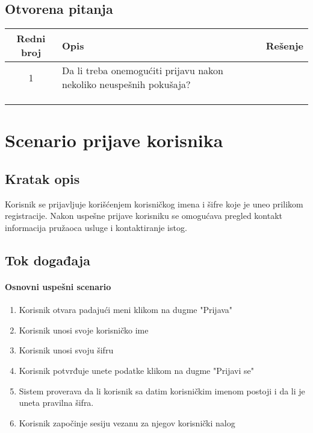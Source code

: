 \documentclass[a4paper,12pt]{report}
\newcommand{\genitivfunkcionalnosti}{prijave korisnika}
\begin{document}
		\subsection{Otvorena pitanja}
			\begin{tabular}{ |c|p{10cm}|l| }
				\hline
				\textbf{Redni broj} & \textbf{Opis} & \textbf{Rešenje} \\ 
				\hline
			    1 & Da li treba onemogućiti prijavu nakon nekoliko neuspešnih pokušaja? &  \\
				\hline
			    &  & \\
				\hline
				&  & \\
				\hline
				&  & \\
				\hline
			\end{tabular}
	\section{Scenario \genitivfunkcionalnosti}
		\subsection{Kratak opis}
			Korisnik se prijavljuje korišćenjem korisničkog imena i šifre koje je uneo prilikom
			registracije. Nakon uspešne prijave korisniku se omogućava pregled kontakt informacija pružaoca usluge i
			kontaktiranje istog.
		\newpage
		\subsection{Tok događaja}
			\paragraph*{Osnovni uspešni scenario}
				\begin{enumerate}
					\item Korisnik otvara padajući meni klikom na dugme "Prijava"
					\item Korisnik unosi svoje korisničko ime
					\item Korisnik unosi svoju šifru
					\item Korisnik potvrđuje unete podatke klikom na dugme "Prijavi se"
					\item Sistem proverava da li korisnik sa datim korisničkim imenom postoji i da li je uneta pravilna šifra.
					\item Korisnik započinje sesiju vezanu za njegov korisnički nalog
				\end{enumerate}
\end{document}
